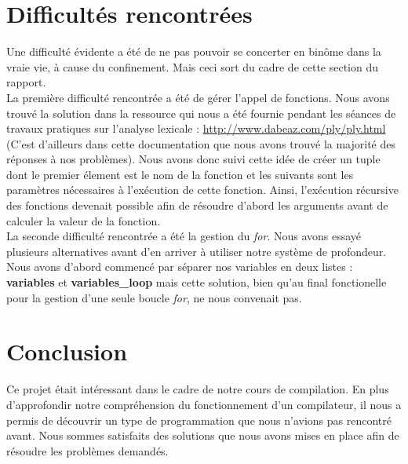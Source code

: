 \documentclass[11pt]{article}
\begin{document}
\section{Difficultés rencontrées}
Une difficulté évidente a été de ne pas pouvoir se concerter en binôme dans la vraie vie, à cause du confinement. Mais ceci sort du cadre de cette section du rapport.\\
La première difficulté rencontrée a été de gérer l'appel de fonctions. Nous avons trouvé la solution dans la ressource qui nous a été fournie pendant les séances de travaux pratiques sur l'analyse lexicale : \url{http://www.dabeaz.com/ply/ply.html} (C'est d'ailleurs dans cette documentation que nous avons trouvé la majorité des réponses à nos problèmes). Nous avons donc suivi cette idée de créer un tuple dont le premier élement est le nom de la fonction et les suivants sont les paramètres nécessaires à l'exécution de cette fonction. Ainsi, l'exécution récursive des fonctions devenait possible afin de résoudre d'abord les arguments avant de calculer la valeur de la fonction.\\
La seconde difficulté rencontrée a été la gestion du \emph{for}. Nous avons essayé plusieurs alternatives avant d'en arriver à utiliser notre système de profondeur. Nous avons d'abord commencé par séparer nos variables en deux listes : \textbf{variables} et 
\textbf{variables\_loop} mais cette solution, bien qu'au final fonctionelle pour la gestion d'une seule boucle \emph{for}, ne nous convenait pas.\\

\section{Conclusion}
Ce projet était intéressant dans le cadre de notre cours de compilation. En plus d'approfondir notre compréhension du fonctionnement d'un compilateur, il nous a permis de découvrir un type de programmation que nous n'avions pas rencontré avant. Nous sommes satisfaits des solutions que nous avons mises en place afin de résoudre les problèmes demandés.
\end{document}
